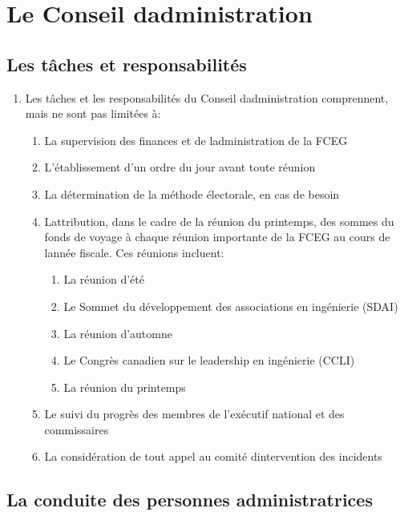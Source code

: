 \section{Le Conseil d\textquotesingle administration}
\label{le-conseil-dadministration}

\subsection{Les tâches et responsabilités}
\label{les-taches-et-responsabilites}

\begin{enumerate}
 \item
  Les tâches et les responsabilités du Conseil d\textquotesingle administration comprennent, mais ne sont pas limitées à:

  \begin{enumerate}
   \item
    La supervision des finances et de l\textquotesingle administration de la FCEG
   \item
    L'établissement d'un ordre du jour avant toute réunion
   \item
    La détermination de la méthode électorale, en cas de besoin
   \item
    L\textquotesingle attribution, dans le cadre de la réunion du printemps, des sommes du fonds de voyage à chaque réunion importante de la FCEG au cours de l\textquotesingle année fiscale. Ces réunions incluent:

    \begin{enumerate}
     \item
      La réunion d'été
     \item
      Le Sommet du développement des associations en ingénierie (SDAI)
     \item
      La réunion d'automne
     \item
      Le Congrès canadien sur le leadership en ingénierie (CCLI)
     \item
      La réunion du printemps
    \end{enumerate}
   \item
    Le suivi du progrès des membres de l'exécutif national et des commissaires
   \item
    La considération de tout appel au comité d\textquotesingle intervention des incidents
  \end{enumerate}
\end{enumerate}

\subsection{La conduite des personnes administratrices}
\label{la-conduite-des-personnes-administratrices}

